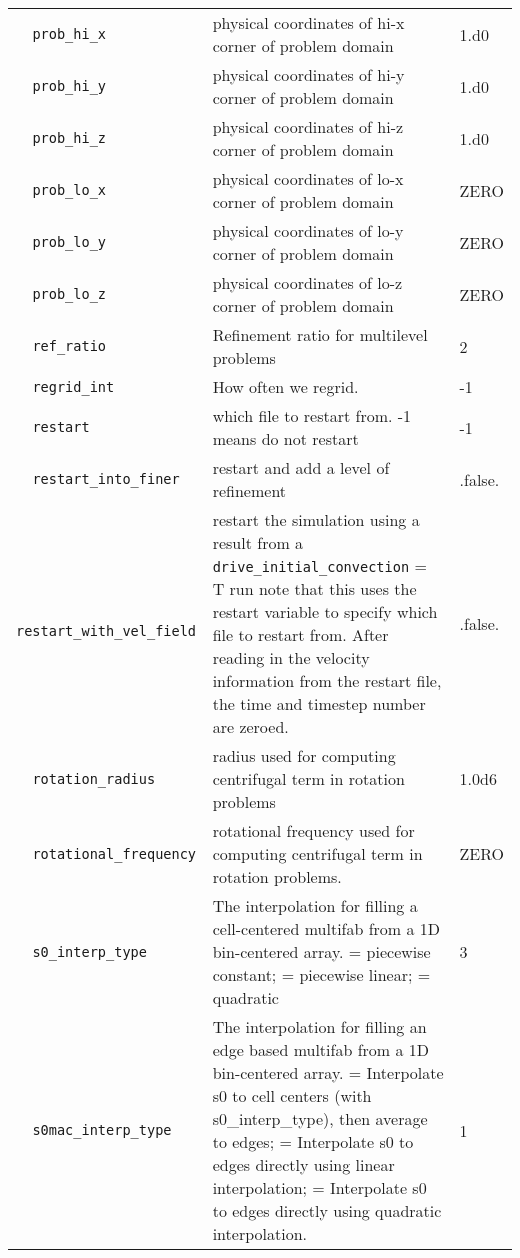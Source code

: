 {\begin{center}
\begin{longtable}{|l|p{3.25in}|l|}
\verb=  prob_hi_x  = &   physical coordinates of hi-x corner of problem domain  &  1.d0 \\
\verb=  prob_hi_y  = &   physical coordinates of hi-y corner of problem domain  &  1.d0 \\
\verb=  prob_hi_z  = &   physical coordinates of hi-z corner of problem domain  &  1.d0 \\
\verb=  prob_lo_x  = &   physical coordinates of lo-x corner of problem domain  &  ZERO \\
\verb=  prob_lo_y  = &   physical coordinates of lo-y corner of problem domain  &  ZERO \\
\verb=  prob_lo_z  = &   physical coordinates of lo-z corner of problem domain  &  ZERO \\
\verb=  ref_ratio  = &   Refinement ratio for multilevel problems  &  2 \\
\verb=  regrid_int  = &   How often we regrid.  &  -1 \\
\verb=  restart  = &   which file to restart from.  -1 means do not restart  &  -1 \\
\verb=  restart_into_finer  = &   restart and add a level of refinement  &  .false. \\
\verb=  restart_with_vel_field  = &   restart the simulation using a result from a {\tt drive\_initial\_convection} = T run note that this uses the restart variable to specify which file to restart from.  After reading in the velocity information from the restart file, the time and timestep number are zeroed.  &  .false. \\
\verb=  rotation_radius  = &   radius used for computing centrifugal term in rotation problems  &  1.0d6 \\
\verb=  rotational_frequency  = &   rotational frequency used for computing centrifugal term in rotation problems.  &  ZERO \\
\verb=  s0_interp_type  = &   The interpolation for filling a cell-centered multifab from a 1D bin-centered array. \newline 1 = piecewise constant; \newline 2 = piecewise linear; \newline 3 = quadratic  &  3 \\
\verb=  s0mac_interp_type  = &   The interpolation for filling an edge based multifab from a 1D bin-centered array. \newline 1 = Interpolate s0 to cell centers (with s0\_interp\_type), then average to edges; \newline 2 = Interpolate s0 to edges directly using linear interpolation; \newline 3 = Interpolate s0 to edges directly using quadratic interpolation.  &  1 \\

\end{longtable}
\end{center}}
